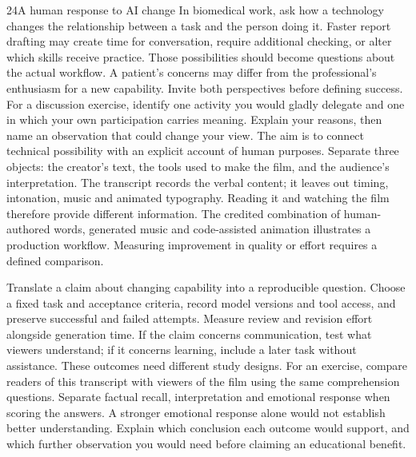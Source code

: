 \begin{slidenotes}{24}{A human response to AI change}
In biomedical work, ask how a technology changes the relationship between a task and the person doing it. Faster report drafting may create time for conversation, require additional checking, or alter which skills receive practice. Those possibilities should become questions about the actual workflow. A patient's concerns may differ from the professional's enthusiasm for a new capability. Invite both perspectives before defining success. For a discussion exercise, identify one activity you would gladly delegate and one in which your own participation carries meaning. Explain your reasons, then name an observation that could change your view. The aim is to connect technical possibility with an explicit account of human purposes.
\comppath
Separate three objects: the creator's text, the tools used to make the film, and the audience's interpretation. The transcript records the verbal content; it leaves out timing, intonation, music and animated typography. Reading it and watching the film therefore provide different information. The credited combination of human-authored words, generated music and code-assisted animation illustrates a production workflow. Measuring improvement in quality or effort requires a defined comparison.

Translate a claim about changing capability into a reproducible question. Choose a fixed task and acceptance criteria, record model versions and tool access, and preserve successful and failed attempts. Measure review and revision effort alongside generation time. If the claim concerns communication, test what viewers understand; if it concerns learning, include a later task without assistance. These outcomes need different study designs. For an exercise, compare readers of this transcript with viewers of the film using the same comprehension questions. Separate factual recall, interpretation and emotional response when scoring the answers. A stronger emotional response alone would not establish better understanding. Explain which conclusion each outcome would support, and which further observation you would need before claiming an educational benefit.
\end{slidenotes}

